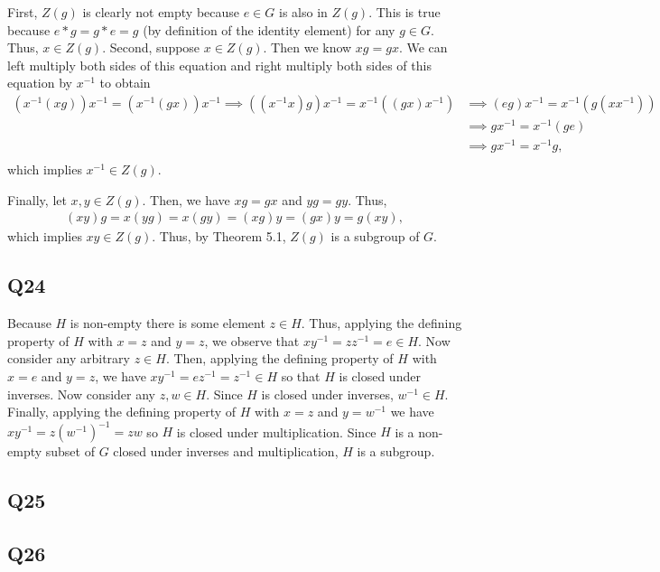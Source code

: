 \documentclass[12pt]{article}
\numberwithin{theorem}{section}
\numberwithin{equation}{section}
\numberwithin{remark}{section}
\numberwithin{definition}{section}
\numberwithin{theorem}{section}
\numberwithin{lemma}{section}
\numberwithin{example}{section}
\begin{document}
First, $Z(g)$ is clearly not empty because $e\in G$ is also in $Z(g)$. This is true because $e*g=g*e=g$ (by definition of the identity element) for any $g\in G$. Thus, $x\in Z(g)$. Second, suppose $x\in Z(g)$. Then we know $xg=gx$. We can left multiply both sides of this equation and right multiply both sides of this equation by $x^{-1}$ to obtain
\begin{align*}
	\left(x^{-1}(xg)\right)x^{-1}=\left(x^{-1}(gx)\right)x^{-1} \implies \left((x^{-1}x)g\right)x^{-1}=x^{-1}\left((gx)x^{-1}\right) & \implies \left(eg\right)x^{-1}=x^{-1}\left(g(xx^{-1})\right) \\
	& \implies gx^{-1}=x^{-1}(ge) \\
	& \implies gx^{-1}=x^{-1}g, \\
\end{align*}
which implies $x^{-1}\in Z(g)$.

Finally, let $x,y\in Z(g)$. Then, we have $xg=gx$ and $yg=gy$. Thus,
\begin{align*}
	(xy)g=x(yg)=x(gy)=(xg)y=(gx)y=g(xy),
\end{align*}
which implies $xy\in Z(g)$. Thus, by Theorem 5.1, $Z(g)$ is a subgroup of $G$.



\subsection{Q24}

Because $H$ is non-empty there is some element $z\in H$. Thus, applying the defining property of $H$ with $x=z$ and $y=z$, we observe that $xy^{-1}=zz^{-1}=e\in H$. Now consider any arbitrary $z\in H$. Then, applying the defining property of $H$ with $x=e$ and $y=z$, we have $xy^{-1}=ez^{-1}=z^{-1}\in H$ so that $H$ is closed under inverses. Now consider any $z,w\in H$. Since $H$ is closed under inverses, $w^{-1}\in H$. Finally, applying the defining property of $H$ with $x=z$ and $y=w^{-1}$ we have $xy^{-1}=z\left(w^{-1}\right)^{-1}=zw$ so $H$ is closed under multiplication. Since $H$ is a non-empty subset of $G$ closed under inverses and multiplication, $H$ is a subgroup. 



\subsection{Q25}

\subsection{Q26}
\end{document}

